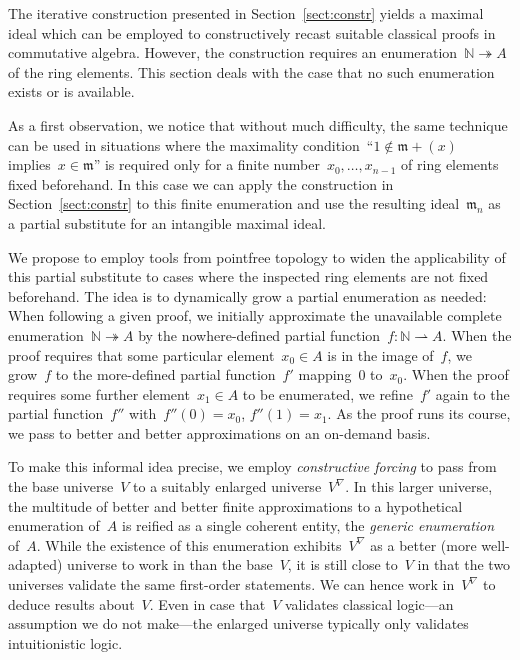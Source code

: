 \documentclass[envcountsect,envcountsame,runningheads]{llncs}
\newcommand{\mmm}{\mathfrak{m}}
\newcommand{\NN}{\mathbb{N}}
\renewcommand{\_}{\mathpunct{.}\,}
\begin{document}
The iterative construction presented in Section~\ref{sect:constr} yields a
maximal ideal which can be employed to constructively recast suitable classical proofs in
commutative algebra. However, the construction requires an enumeration~$\NN
\twoheadrightarrow A$ of the ring elements. This section deals with the case
that no such enumeration exists or is available.

As a first observation, we notice that without much difficulty, the same technique can be used in situations where the
maximality condition~``$1 \not\in \mmm + (x)$ implies~$x \in \mmm$''
is required only for a finite number~$x_0,\ldots,x_{n-1}$ of ring elements
fixed beforehand. In this case we can apply the construction in Section~\ref{sect:constr} to
this finite enumeration and use the resulting ideal~$\mmm_n$ as a partial
substitute for an intangible maximal ideal.

We propose to employ tools from pointfree topology to
widen the applicability of this partial
substitute to cases where the inspected ring elements are
not fixed beforehand. The idea is to dynamically grow a partial enumeration as
needed: When following a given proof, we initially approximate the unavailable
complete enumeration~$\NN \twoheadrightarrow A$ by the nowhere-defined partial
function~$f : \NN \rightharpoonup A$. When the proof requires
that some particular element~$x_0 \in A$ is in the image of~$f$, we grow~$f$ to
the more-defined partial function~$f'$ mapping~$0$ to~$x_0$. When the proof
requires some further element~$x_1 \in A$ to be enumerated, we refine~$f'$
again to the partial function~$f''$ with~$f''(0) = x_0$, $f''(1) = x_1$.
As the proof runs its course, we pass to better and better approximations on an
on-demand basis.

To make this informal idea precise, we employ \emph{constructive forcing} to
pass from the base universe~$V$ to a suitably enlarged universe~$V^\nabla$. In
this larger universe, the multitude of better and better finite approximations to a
hypothetical enumeration of~$A$ is reified as a single coherent entity, the
\emph{generic enumeration} of~$A$. While the existence of this enumeration
exhibits~$V^\nabla$ as a better (more well-adapted) universe to work in than the
base~$V$, it is still close to~$V$ in that the two universes
validate the same first-order statements. We can hence work in~$V^\nabla$ to
deduce results about~$V$. Even in case that~$V$ validates classical logic---an
assumption we do not make---the enlarged universe typically only validates
intuitionistic logic.
\end{document}
